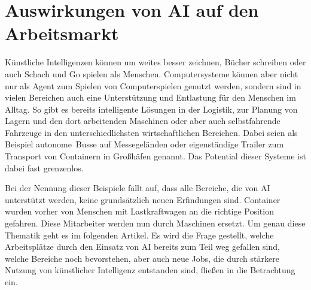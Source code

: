 \chapter{Auswirkungen von \ac{AI} auf den Arbeitsmarkt}

Künstliche Intelligenzen können um weites besser zeichnen, Bücher schreiben oder auch Schach und Go spielen als Menschen. \cite{jerzy_2019} Computersysteme können aber nicht nur als Agent zum Spielen von Computerspielen genutzt werden, sondern sind in vielen Bereichen auch eine Unterstützung und Entlastung für den Menschen im Alltag. So gibt es bereits intelligente Lösungen in der Logistik, zur Planung von Lagern und den dort arbeitenden Maschinen oder aber auch selbstfahrende Fahrzeuge in den unterschiedlichsten wirtschaftlichen Bereichen. Dabei seien als Beispiel autonome Busse auf Messegeländen oder eigenständige Trailer zum Transport von Containern in Großhäfen genannt. Das Potential dieser Systeme ist dabei fast grenzenlos. \cite{bachmann_2020}

Bei der Nennung dieser Beispiele fällt auf, dass alle Bereiche, die von \ac{AI} unterstützt werden, keine grundsätzlich neuen Erfindungen sind. Container wurden vorher von Menschen mit Lastkraftwagen an die richtige Position gefahren. Diese Mitarbeiter werden nun durch Maschinen ersetzt. Um genau diese Thematik geht es im folgenden Artikel. Es wird die Frage gestellt, welche Arbeitsplätze durch den Einsatz von \ac{AI} bereits zum Teil weg gefallen sind, welche Bereiche noch bevorstehen, aber auch neue Jobs, die durch stärkere Nutzung von künstlicher Intelligenz entstanden sind, fließen in die Betrachtung ein.

